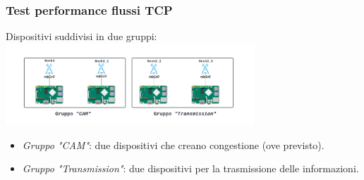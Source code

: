 \documentclass{beamer}
\begin{document}
\begin{frame}
\begin{minipage}{0.38\textwidth}
    \end{minipage}
\end{frame}

\begin{frame}
    \frametitle{Test performance flussi TCP}
    \vfill
    \centering
    Dispositivi suddivisi in due gruppi:
    \includegraphics[width=0.7\textwidth]{Rock scheme.png}
    \begin{itemize}
        \item \textit{Gruppo "CAM"}: due dispositivi che creano congestione (ove previsto).
        \item \textit{Gruppo "Transmission"}: due dispositivi per la trasmissione delle informazioni.
    \end{itemize}
    \vfill
\end{frame}
\end{document}
